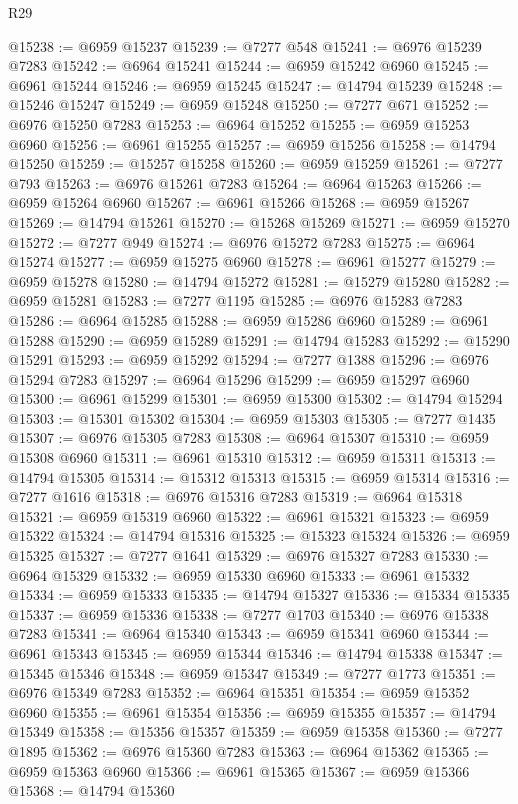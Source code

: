 \begin{lexlean}{R29}
\begin{coremodule}
@15238 := @6959 @15237
@15239 := @7277 @548
@15241 := @6976 @15239 @7283
@15242 := @6964 @15241
@15244 := @6959 @15242 @6960
@15245 := @6961 @15244
@15246 := @6959 @15245
@15247 := @14794 @15239
@15248 := @15246 @15247
@15249 := @6959 @15248
@15250 := @7277 @671
@15252 := @6976 @15250 @7283
@15253 := @6964 @15252
@15255 := @6959 @15253 @6960
@15256 := @6961 @15255
@15257 := @6959 @15256
@15258 := @14794 @15250
@15259 := @15257 @15258
@15260 := @6959 @15259
@15261 := @7277 @793
@15263 := @6976 @15261 @7283
@15264 := @6964 @15263
@15266 := @6959 @15264 @6960
@15267 := @6961 @15266
@15268 := @6959 @15267
@15269 := @14794 @15261
@15270 := @15268 @15269
@15271 := @6959 @15270
@15272 := @7277 @949
@15274 := @6976 @15272 @7283
@15275 := @6964 @15274
@15277 := @6959 @15275 @6960
@15278 := @6961 @15277
@15279 := @6959 @15278
@15280 := @14794 @15272
@15281 := @15279 @15280
@15282 := @6959 @15281
@15283 := @7277 @1195
@15285 := @6976 @15283 @7283
@15286 := @6964 @15285
@15288 := @6959 @15286 @6960
@15289 := @6961 @15288
@15290 := @6959 @15289
@15291 := @14794 @15283
@15292 := @15290 @15291
@15293 := @6959 @15292
@15294 := @7277 @1388
@15296 := @6976 @15294 @7283
@15297 := @6964 @15296
@15299 := @6959 @15297 @6960
@15300 := @6961 @15299
@15301 := @6959 @15300
@15302 := @14794 @15294
@15303 := @15301 @15302
@15304 := @6959 @15303
@15305 := @7277 @1435
@15307 := @6976 @15305 @7283
@15308 := @6964 @15307
@15310 := @6959 @15308 @6960
@15311 := @6961 @15310
@15312 := @6959 @15311
@15313 := @14794 @15305
@15314 := @15312 @15313
@15315 := @6959 @15314
@15316 := @7277 @1616
@15318 := @6976 @15316 @7283
@15319 := @6964 @15318
@15321 := @6959 @15319 @6960
@15322 := @6961 @15321
@15323 := @6959 @15322
@15324 := @14794 @15316
@15325 := @15323 @15324
@15326 := @6959 @15325
@15327 := @7277 @1641
@15329 := @6976 @15327 @7283
@15330 := @6964 @15329
@15332 := @6959 @15330 @6960
@15333 := @6961 @15332
@15334 := @6959 @15333
@15335 := @14794 @15327
@15336 := @15334 @15335
@15337 := @6959 @15336
@15338 := @7277 @1703
@15340 := @6976 @15338 @7283
@15341 := @6964 @15340
@15343 := @6959 @15341 @6960
@15344 := @6961 @15343
@15345 := @6959 @15344
@15346 := @14794 @15338
@15347 := @15345 @15346
@15348 := @6959 @15347
@15349 := @7277 @1773
@15351 := @6976 @15349 @7283
@15352 := @6964 @15351
@15354 := @6959 @15352 @6960
@15355 := @6961 @15354
@15356 := @6959 @15355
@15357 := @14794 @15349
@15358 := @15356 @15357
@15359 := @6959 @15358
@15360 := @7277 @1895
@15362 := @6976 @15360 @7283
@15363 := @6964 @15362
@15365 := @6959 @15363 @6960
@15366 := @6961 @15365
@15367 := @6959 @15366
@15368 := @14794 @15360

\end{coremodule}
\end{lexlean}

